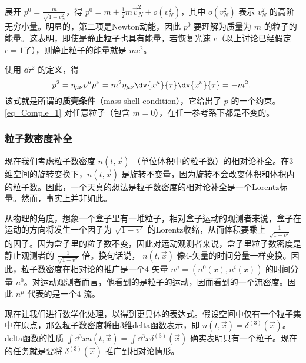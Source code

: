 展开 $p^0=\frac{m}{\sqrt{1-v_N^2}}$，得 $p^0=m+\frac{1}{2}m\vec v_N^2+o(v_N^2)$，其中 $o(v_N^2)$ 表示 $v_N^2$ 的高阶无穷小量。明显的，第二项是Newton动能，因此 $p^0$ 要理解为质量为 $m$ 的粒子的能量。这表明，即使是静止粒子也具有能量，若恢复光速 $c$（以上讨论已经假定 $c=1$了），则静止粒子的能量就是 $mc^2$。

使用 $\dd\tau^2$ 的定义，得
\begin{equation}\label{eq_Comple_1}
p^2=\eta_{\mu\nu}p^\mu p^\nu=m^2\eta_{\mu\nu}\dv{x^\mu}{\tau}\dv{x^\nu}{\tau}=-m^2.~
\end{equation}
该式就是所谓的\textbf{质壳条件}（mass shell condition），它给出了 $p$ 的一个约束。\autoref{eq_Comple_1} 对任意粒子（包含 $m=0$），在任一参考系下都是不变的。


\subsubsection{粒子数密度补全}

现在我们考虑粒子数密度 $n(t,\vec x)$ （单位体积中的粒子数）的相对论补全。在3维空间的旋转变换下，$n(t,\vec x)$ 是旋转不变量，因为旋转不会改变体积和体积内的粒子数。因此，一个天真的想法是粒子数密度的相对论补全是一个Lorentz标量。然而，事实上并非如此。

从物理的角度，想象一个盒子里有一堆粒子，相对盒子运动的观测者来说，盒子在运动的方向将发生一个因子为 $\sqrt{1-v^2}$ 的Lorentz收缩，从而体积要乘上 $\frac{1}{\sqrt{1-v^2}}$ 的因子。因为盒子里的粒子数不变，因此对运动观测者来说，盒子里粒子数密度是静止观测者的 $\frac{1}{\sqrt{1-v^2}}$ 倍。换句话说， $n(t,\vec x)$ 像4-矢量的时间分量一样变换。因此，粒子数密度在相对论的推广是一个4-矢量 $n^\mu=(n^0(x),n^i(x))$ 的时间分量 $n^0$。对运动观测者而言，他看到的是粒子的运动，因而看到的一个流密度。因此 $n^\mu$ 代表的是一个4-流。

现在让我们进行数学化处理，以得到更具体的表达式。假设空间中仅有一个粒子集中在原点，那么粒子数密度将由3维delta函数表示，即 $n(t,\vec x)=\delta^{(3)}(\vec x)$。delta函数的性质 $\int\dd{^3} xn(t,\vec x)=\int\dd{^3} x\delta^{(3)}(\vec x)$ 确实表明只有一个粒子。现在的任务就是要将 $\delta^{(3)}(\vec x)$ 推广到相对论情形。

